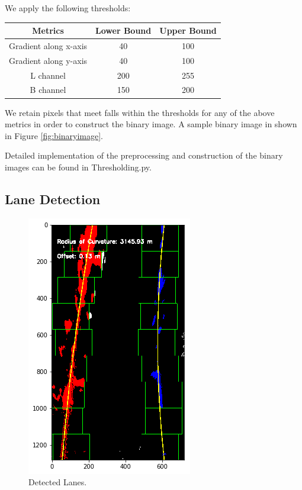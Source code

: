 \documentclass[12pt,twoside]{article}
\begin{document}
We apply the following thresholds:
\begin{center}
	\begin{tabular}{|c|c|c|}
	\hline
	Metrics							&			Lower Bound			& 			Upper Bound\\\hline
	Gradient along x-axis	&			40						&			100\\
	Gradient along y-axis	&			40						&			100\\
	L channel						&			200						&			255\\
	B channel						&			150						&			200\\\hline
	\end{tabular}
\end{center}

We retain pixels that meet falls within the thresholds for any of the above metrics in order to construct the binary image. A sample binary image in shown in Figure  \ref{fig:binaryimage}.


Detailed implementation of the preprocessing and construction of the binary images can be found in Thresholding.py.

\subsection{Lane Detection}
\begin{figure}[H]
	\begin{center}
		\includegraphics[width = 0.4\hsize]{./figures/LaneDetection.png} 
		\caption{Detected Lanes.} %
		\label{fig:detection} %
	\end{center}
\end{figure} 
\end{document}
